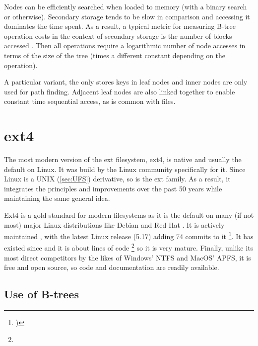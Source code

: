         Nodes can be efficiently searched when loaded to memory (with a binary
        search or otherwise). Secondary storage tends to be slow in comparison
        and accessing it dominates the time spent. As a result, a typical
        metric for measuring B-tree operation costs in the context of secondary
        storage is the number of blocks accessed \cite{btree_ubiquitous}. Then
        all operations require a logarithmic number of node accesses in terms
        of the size of the tree (times a different constant depending on the
        operation).

        A particular variant, the \bplustree only stores keys in leaf nodes and
        inner nodes are only used for path finding. Adjacent leaf nodes are
        also linked together to enable constant time sequential access, as is
        common with files.

    \section{ext4}
        \label{sec:ext4}

        The most modern version of the ext filesystem, ext4, is native and
        usually the default on Linux. It was build by the Linux community
        specifically for it. Since Linux is a UNIX (\autoref{sec:UFS}) derivative,
        so is the ext family. As a result, it integrates the principles and
        improvements over the past 50 years while maintaining the same general
        idea.

        Ext4 is a gold standard for modern filesystems as it is the default on
        many (if not most) major Linux distributions like Debian
        \cite{Debian_filesystem} and Red Hat \cite{RedHat_filesystem}. It is
        actively maintained \cite{ext4_mailing_list}, with the latest Linux
        release (5.17) adding 74 commits to it \footnote{)}. It has existed since 
        and it is about  lines of code
        \footnote{} so it is very mature. Finally,
        unlike its most direct competitors by the likes of Windows' NTFS and
        MacOS' APFS, it is free and open source, so code and documentation are
        readily available.

        \subsection{Use of B-trees}
            \label{sec:htree}

